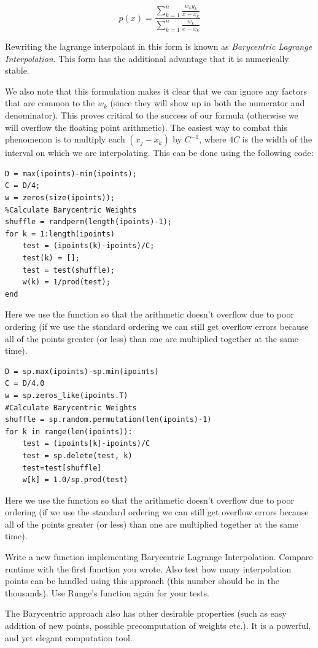 \[
p(x) = \frac{\displaystyle\sum_{k=1}^n \frac{w_k y_k}{x-x_k}}{\displaystyle\sum_{k=1}^n \frac{w_k}{x-x_k}}
\]

Rewriting the lagrange interpolant in this form is known as \emph{Barycentric Lagrange Interpolation}. This form has the additional advantage that it is numerically stable.

We also note that this formulation makes it clear that we can ignore any factors that are common to the $w_k$ (since they will show up in both the numerator and denominator). This proves critical to the success of our formula (otherwise we will overflow the floating point arithmetic). The easiest way to combat this phenomenon is to multiply each $(x_j-x_k)$ by $C^{-1}$, where $4C$ is the width of the interval on which we are interpolating. This can be done using the following code:

\begin{matlab}
\begin{lstlisting}[style=matlab]
D = max(ipoints)-min(ipoints);
C = D/4;
w = zeros(size(ipoints));
%Calculate Barycentric Weights
shuffle = randperm(length(ipoints)-1);
for k = 1:length(ipoints)
    test = (ipoints(k)-ipoints)/C;
    test(k) = [];
    test = test(shuffle);
    w(k) = 1/prod(test);
end
\end{lstlisting}

Here we use the  function so that the arithmetic doesn't overflow due to poor ordering (if we use the standard ordering we can still get overflow errors because all of the points greater (or less) than one are multiplied together at the same time).
\end{matlab}
\begin{python}
\begin{lstlisting}[style=python]
D = sp.max(ipoints)-sp.min(ipoints)
C = D/4.0
w = sp.zeros_like(ipoints.T)
#Calculate Barycentric Weights
shuffle = sp.random.permutation(len(ipoints)-1)
for k in range(len(ipoints)):
    test = (ipoints[k]-ipoints)/C
    test = sp.delete(test, k)
    test=test[shuffle]
    w[k] = 1.0/sp.prod(test)
\end{lstlisting}

Here we use the  function so that the arithmetic doesn't overflow due to poor ordering (if we use the standard ordering we can still get overflow errors because all of the points greater (or less) than one are multiplied together at the same time).
\end{python}

\begin{problem}
Write a new function implementing Barycentric Lagrange Interpolation. Compare runtime with the first function you wrote. Also test how many interpolation points can be handled using this approach (this number should be in the thousands). Use Runge's function again for your tests.
\end{problem}

The Barycentric approach also has other desirable properties (such as easy addition of new points, possible precomputation of weights etc.). It is a powerful, and yet elegant computation tool.